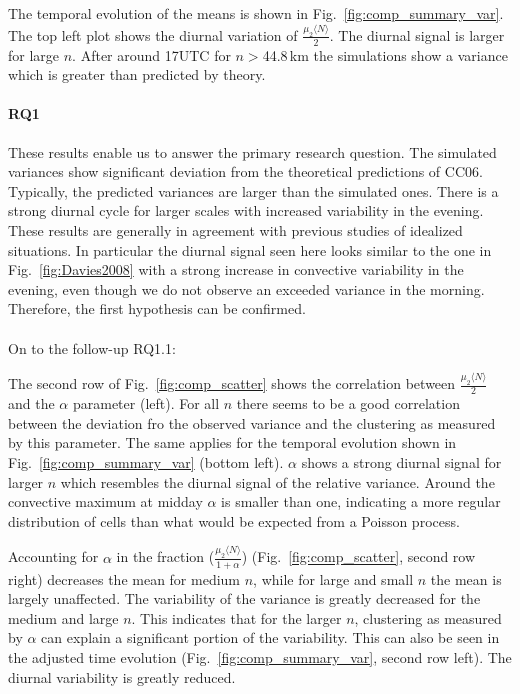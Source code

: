 \documentclass[a4paper, 12pt]{article}
\begin{document}
The temporal evolution of the means is shown in Fig.~\ref{fig:comp_summary_var}. The top left plot shows the diurnal variation of $\frac{\mu_2 \langle N \rangle}{2}$. The diurnal signal is larger for large $n$. After around 17UTC for $n>$44.8\,km the simulations show a variance which is greater than predicted by theory. 

\paragraph{RQ1} These results enable us to answer the primary research question. The simulated variances show significant deviation from the theoretical predictions of CC06. Typically, the predicted variances are larger than the simulated ones. There is a strong diurnal cycle for larger scales with increased variability in the evening. These results are generally in agreement with previous studies of idealized situations. In particular the diurnal signal seen here looks similar to the one in Fig.~\ref{fig:Davies2008} with a strong increase in convective variability in the evening, even though we do not observe an exceeded variance in the morning. Therefore, the first hypothesis can be confirmed. \\ \\

On to the follow-up RQ1.1:

The second row of Fig.~\ref{fig:comp_scatter} shows the correlation between $\frac{\mu_2 \langle N \rangle}{2}$ and the $\alpha$ parameter (left). For all $n$ there seems to be a good correlation between the deviation fro the observed variance and the clustering as measured by this parameter. The same applies for the temporal evolution shown in Fig.~\ref{fig:comp_summary_var} (bottom left). $\alpha$ shows a strong diurnal signal for larger $n$ which resembles the diurnal signal of the relative variance. Around the convective maximum at midday $\alpha$ is smaller than one, indicating a more regular distribution of cells than what would be expected from a Poisson process. 

Accounting for $\alpha$ in the fraction ($\frac{\mu_2 \langle N \rangle}{1+\alpha}$) (Fig.~\ref{fig:comp_scatter}, second row right) decreases the mean for medium $n$, while for large and small $n$ the mean is largely unaffected. The variability of the variance is greatly decreased for the medium and large $n$. This indicates that for the larger $n$, clustering as measured by $\alpha$ can explain a significant portion of the variability. This can also be seen in the adjusted time evolution (Fig.~\ref{fig:comp_summary_var}, second row left). The diurnal variability is greatly reduced. 
\end{document}
